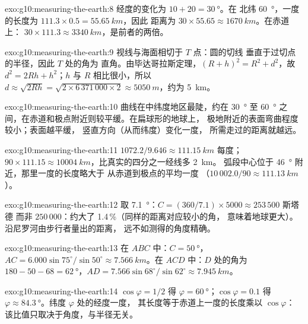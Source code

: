 \begin{solution}{exo:g10:measuring-the-earth:8}
经度的变化为 $10 + 20 = \qty{30}{\degree}$。在
北纬 \qty{60}{\degree}，一度的长度为 $111.3 \times 0.5 = \qty{55.65}{km}$，因此
距离为 $30 \times 55.65 \approx \qty{1670}{km}$。在赤道上：
$30 \times 111.3 \approx \qty{3340}{km}$，是前者的两倍。
\end{solution}

\begin{solution}{exo:g10:measuring-the-earth:9}
视线与海面相切于 $T$ 点：圆的切线
垂直于过切点的半径，因此 $T$ 处的角为
直角。由毕达哥拉斯定理，$(R+h)^2 = R^2 + d^2$，故 $d^2 = 2Rh + h^2$；$h$ 与
$R$ 相比很小，所以 $d \approx \sqrt{2Rh} = \sqrt{2 \times
6\,371\,000 \times 2} \approx \qty{5050}{m}$，约为 \qty{5}{km}。
\end{solution}

\begin{solution}{exo:g10:measuring-the-earth:10}
曲线在中纬度地区最陡，约在 \qty{30}{\degree} 至
\qty{60}{\degree} 之间，在赤道和极点附近则较平缓。在扁球形的地球上，
极地附近的表面弯曲程度较小；表面越平缓，
竖直方向（从而纬度）变化一度，
所需走过的距离就越远。
\end{solution}

\begin{solution}{exo:g10:measuring-the-earth:11}
$1072.2/9.646 \approx \qty{111.15}{km}$ 每度；$90 \times 111.15
\approx \qty{10004}{km}$，比真实的四分之一经线多 \qty{2}{km}。
弧段中心位于 \qty{46}{\degree} 附近，那里一度的长度略大于
从赤道到极点的平均一度
（$10\,002.0/90 \approx \qty{111.13}{km}$）。
\end{solution}

\begin{solution}{exo:g10:measuring-the-earth:12}
取 \qty{7.1}{\degree}：$C = (360/7.1) \times 5000 \approx 253\,500$ 斯塔德
而非 $250\,000$：约大了 1.4\,\%（同样的距离对应较小的角，
意味着地球更大）。沿尼罗河由步行者量出的距离，
远不如测得的角度精确。
\end{solution}

\begin{solution}{exo:g10:measuring-the-earth:13}
在 $ABC$ 中：$C = \qty{50}{\degree}$，$AC = 6.000 \sin 75^\circ/\sin 50^\circ
\approx \qty{7.566}{km}$。在 $ACD$ 中：$D$ 处的角为 $180 - 50 - 68 =
\qty{62}{\degree}$，$AD = 7.566 \sin 68^\circ/\sin 62^\circ \approx
\qty{7.945}{km}$。
\end{solution}

\begin{solution}{exo:g10:measuring-the-earth:14}
$\cos\varphi = 1/2$ 得 $\varphi = \qty{60}{\degree}$；$\cos\varphi = 0.1$
得 $\varphi \approx \qty{84.3}{\degree}$。纬度 $\varphi$ 处的经度一度，
其长度等于赤道上一度的长度乘以 $\cos\varphi$：
该比值只取决于角度，与半径无关。
\end{solution}


